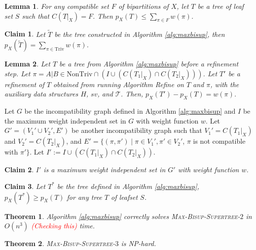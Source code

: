 \documentclass{article}
\newcommand{\note}[1]{\textcolor{red}{#1}}
\newcommand{\triv}{\mathrm{Triv}}
\newcommand{\ntriv}{\mathrm{NonTriv}}
\newtheorem{theorem}{Theorem}
\newtheorem{lemma}{Lemma}
\newtheorem{claim}{Claim}
\begin{document}
\begin{lemma} \label{lem:compatible_set_upperbound}
    For any compatible set $F$ of bipartitions of $X$, let $T$ be a tree of leaf set $S$ such that $C(T|_X) = F$. Then $p_X(T) \le \sum_{\pi \in F} w(\pi)$.
\end{lemma}

\begin{claim}\label{claim:after_add_trivial}
    Let $\tilde{T}$ be the tree constructed in Algorithm \ref{alg:maxbisup}, then $p_X(\tilde{T}) = \sum_{\pi \in \triv} w(\pi)$. 
\end{claim}

\begin{lemma}\label{lem:refine_achieves_weight}
Let $T$ be a tree from Algorithm \ref{alg:maxbisup} before a refinement step. Let $\pi = A|B \in \ntriv \cap (I \cup (C(T_1|_X)\cap C(T_2|_X)))$. Let $T'$ be a refinement of $T$ obtained from running Algorithm Refine on $T$ and $\pi$, with the auxiliary data structures $H$, $sv$, and $\mathcal{T}$. Then, $p_X(T') - p_X(T) = w(\pi)$. 
\end{lemma}

Let $G$ be the incompatibility graph defined in Algorithm \ref{alg:maxbisup} and $I$ be the maximum weight independent set in $G$ with weight function $w$. Let $G'= (V_1' \cup V_2',E')$ be another incompatibility graph such that $V_1' = C(T_1|_X)$ and $V_2' = C(T_2|_X)$, and $E' = \{(\pi, \pi') \mid \pi \in V_1', \pi' \in V_2'$, $\pi$ is not compatible with $\pi'\}$.  Let $I' := I \cup (C(T_1|_X )\cap C(T_2|_X))$.

\begin{claim}\label{claim:independent_sets_equivalence}
    $I'$ is a maximum weight independent set in $G'$ with weight function $w$. 
\end{claim}

\begin{claim}\label{claim:after_add_all_bipars}
    Let $T^*$ be the tree defined in Algorithm \ref{alg:maxbisup}, $p_X(T^*) \ge p_X(T)$ for any tree $T$ of leafset $S$.
\end{claim}

\begin{theorem}\label{thm:correctness_alg}
Algorithm \ref{alg:maxbisup} correctly solves \textsc{Max-Bisup-Supertree-$2$} in $O(n^3)$ \note{(Checking this)} time.
\end{theorem}

\begin{theorem}\label{thm:hardness}
\textsc{Max-Bisup-Supertree-$3$} is NP-hard.
\end{theorem}




\end{document}
